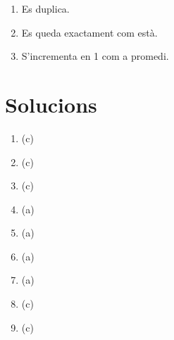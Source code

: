 \begin{enumerate}
\begin{enumerate}
\item Es duplica.
\item Es queda exactament com està.
\item S'incrementa en 1 com a promedi.
\end{enumerate}


\end{enumerate}

\section{Solucions}
\begin{enumerate}
\item (c)
\item (c)
\item (c)
\item (a)
\item (a)
\item (a)
\item (a)
\item (c)
\item (c)


\end{enumerate}

